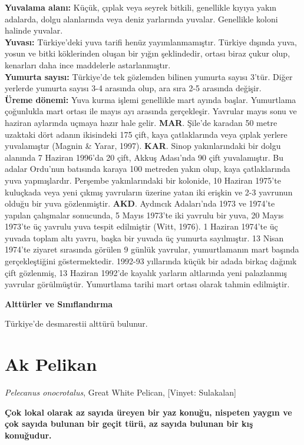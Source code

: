\documentclass[
  a4paper,
  DIV=11,
  numbers=noendperiod]{scrreprt}
\begin{document}
\textbf{Yuvalama alanı:} Küçük, çıplak veya seyrek bitkili, genellikle
kıyıya yakın adalarda, dolgu alanlarında veya deniz yarlarında yuvalar.
Genellikle koloni halinde yuvalar.\\
\textbf{Yuvası:} Türkiye'deki yuva tarifi henüz yayımlanmamıştır.
Türkiye dışında yuva, yosun ve bitki köklerinden oluşan bir yığın
şeklindedir, ortası biraz çukur olup, kenarları daha ince maddelerle
astarlanmıştır.\\
\textbf{Yumurta sayısı:} Türkiye'de tek gözlemden bilinen yumurta sayısı
3'tür. Diğer yerlerde yumurta sayısı 3-4 arasında olup, ara sıra 2-5
arasında değişir.\\
\textbf{Üreme dönemi:} Yuva kurma işlemi genellikle mart ayında başlar.
Yumurtlama çoğunlukla mart ortası ile mayıs ayı arasında gerçekleşir.
Yavrular mayıs sonu ve haziran aylarında uçmaya hazır hale gelir.
\textbf{MAR}. Şile'de karadan 50 metre uzaktaki dört adanın ikisindeki
175 çift, kaya çatlaklarında veya çıplak yerlere yuvalamıştır (Magnin \&
Yarar, 1997). \textbf{KAR}. Sinop yakınlarındaki bir dolgu alanında 7
Haziran 1996'da 20 çift, Akkuş Adası'nda 90 çift yuvalamıştır. Bu adalar
Ordu'nun batısında karaya 100 metreden yakın olup, kaya çatlaklarında
yuva yapmışlardır. Perşembe yakınlarındaki bir kolonide, 10 Haziran
1975'te kuluçkada veya yeni çıkmış yavruların üzerine yatan iki erişkin
ve 2-3 yavrunun olduğu bir yuva gözlenmiştir. \textbf{AKD}. Aydıncık
Adaları'nda 1973 ve 1974'te yapılan çalışmalar sonucunda, 5 Mayıs
1973'te iki yavrulu bir yuva, 20 Mayıs 1973'te üç yavrulu yuva tespit
edilmiştir (Witt, 1976). 1 Haziran 1974'te üç yuvada toplam altı yavru,
başka bir yuvada üç yumurta sayılmıştır. 13 Nisan 1974'te ziyaret
sırasında görülen 9 günlük yavrular, yumurtlamanın mart başında
gerçekleştiğini göstermektedir. 1992-93 yıllarında küçük bir adada
birkaç dağınık çift gözlenmiş, 13 Haziran 1992'de kayalık yarların
altlarında yeni palazlanmış yavrular görülmüştür. Yumurtlama tarihi mart
ortası olarak tahmin edilmiştir.

\textbf{Alttürler ve Sınıflandırma}

Türkiye'de desmarestii alttürü bulunur.

\section{Ak Pelikan}\label{ak-pelikan}

\emph{Pelecanus onocrotalus}, Great White Pelican, {[}Vinyet:
Sulakalan{]}

\textbf{Çok lokal olarak az sayıda üreyen bir yaz konuğu, nispeten
yaygın ve çok sayıda bulunan bir geçit türü, az sayıda bulunan bir kış
konuğudur.}
\end{document}
